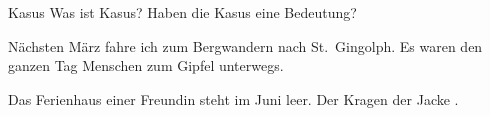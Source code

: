 \begin{frame}
  {Kasus}
  \pause
  Was ist Kasus? Haben die Kasus eine Bedeutung?
  \Halbzeile
  \pause
  \begin{exe}
    \ex
    \begin{xlist}
      \pause
      \pause
      \pause
    \end{xlist}
    \pause
    \ex
    \begin{xlist}
      \pause
      \pause
      \pause
    \end{xlist}
    \pause
    \ex
    \begin{xlist}
      \ex \alert<21->{Nächsten März} fahre ich zum Bergwandern nach St.\ Gingolph.
      \ex Es waren \alert<22->{den ganzen Tag} Menschen zum Gipfel unterwegs.
    \end{xlist}
    \pause
    \ex
    \begin{xlist}
      \ex Das Ferienhaus \alert<23->{einer Freundin} steht im Juni leer.
      \ex Der Kragen \alert<24->{der Jacke} .
    \end{xlist}
  \end{exe}
\end{frame}

